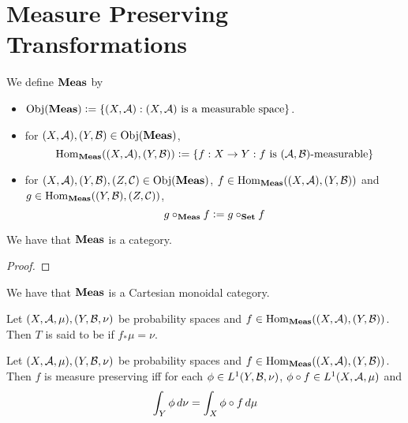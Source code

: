 \documentclass{book}
\begin{document}
	\section{Measure Preserving Transformations}
	
	\begin{defn}
		We define $\Meas$ by 
		\begin{itemize}
			\item $\Obj(\Meas) \defeq \{(X, \MA): (X, \MA) \text{ is a measurable space}\}$.
			\item for $(X, \MA), (Y, \MB) \in \Obj(\Meas)$, 
			$$\Hom_{\Meas}((X, \MA), (Y, \MB)) \defeq \{f:X \rightarrow Y: f \text{ is $(\MA, \MB)$-measurable} \}$$
			\item for $(X, \MA), (Y, \MB), (Z, \MC) \in \Obj(\Meas)$, $f \in \Hom_{\Meas}((X, \MA), (Y, \MB))$ and \\
			$g \in \Hom_{\Meas}((Y, \MB), (Z, \MC))$, 
			$$g \circ_{\Meas} f \defeq g \circ_{\Set} f $$
		\end{itemize}
	\end{defn}

	\begin{ex}
		We have that $\Meas$ is a category.
	\end{ex}

	\begin{proof}
		
	\end{proof}

	\begin{ex}
		We have that $\Meas$ is a Cartesian monoidal category. 
	\end{ex}
	
	\begin{defn}
		Let $(X, \MA, \mu), (Y, \MB, \nu)$ be probability spaces and $f \in \Hom_{\Meas}((X, \MA), (Y, \MB))$. Then $T$ is said to be  if $f_* \mu = \nu$. 
	\end{defn}

	\begin{ex}
		Let $(X, \MA, \mu), (Y, \MB, \nu)$ be probability spaces and $f \in \Hom_{\Meas}((X, \MA), (Y, \MB))$. Then $f$ is measure preserving iff for each $\phi \in L^1(Y, \MB, \nu)$, $\phi \circ f \in L^1(X, \MA, \mu)$ and 
		$$\int_Y \phi \dnu = \int_X \phi \circ f \dmu $$
	\end{ex}
\end{document}
